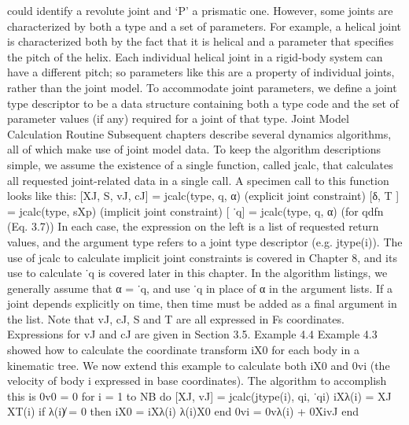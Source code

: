 could identify a revolute joint and ‘P’ a prismatic one. However, some joints are characterized by both a type and a set of parameters. For example, a helical joint is characterized both by the fact that it is helical and a parameter that specifies the pitch of the helix. Each individual helical joint in a rigid-body system can have a different pitch; so parameters like this are a property of individual joints, rather than the joint model. To accommodate joint parameters, we define a joint type descriptor to be a data structure containing both a type code and the set of parameter values (if any) required for a joint of that type. Joint Model Calculation Routine Subsequent chapters describe several dynamics algorithms, all of which make use of joint model data. To keep the algorithm descriptions simple, we assume the existence of a single function, called jcalc, that calculates all requested joint-related data in a single call. A specimen call to this function looks like this: [XJ, S, vJ, cJ] = jcalc(type, q, α) (explicit joint constraint) [δ, T ] = jcalc(type, sXp) (implicit joint constraint) [ ˙q] = jcalc(type, q, α) (for qdfn (Eq. 3.7)) In each case, the expression on the left is a list of requested return values, and the argument type refers to a joint type descriptor (e.g. jtype(i)). The use of jcalc to calculate implicit joint constraints is covered in Chapter 8, and its use to calculate ˙q is covered later in this chapter. In the algorithm listings, we generally assume that α = ˙q, and use ˙q in place of α in the argument lists. If a joint depends explicitly on time, then time must be added as a final argument in the list. Note that vJ, cJ, S and T are all expressed in Fs coordinates. Expressions for vJ and cJ are given in Section 3.5. Example 4.4 Example 4.3 showed how to calculate the coordinate transform iX0 for each body in a kinematic tree. We now extend this example to calculate both iX0 and 0vi (the velocity of body i expressed in base coordinates). The algorithm to accomplish this is 0v0 = 0 for i = 1 to NB do [XJ, vJ] = jcalc(jtype(i), qi, ˙qi) iXλ(i) = XJ XT(i) if λ(i)̸ = 0 then iX0 = iXλ(i) λ(i)X0 end 0vi = 0vλ(i) + 0XivJ end

